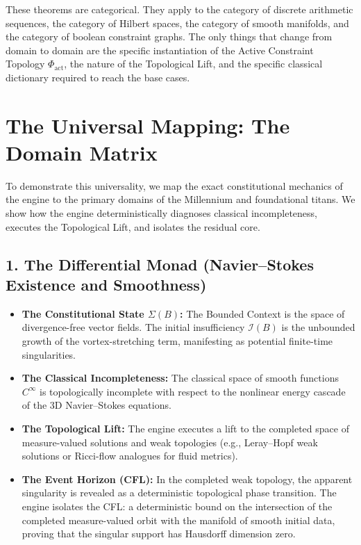 \documentclass[12pt,openany]{extbook}
\theoremstyle{plain}
\theoremstyle{definition}
\begin{document}
These theorems are categorical. They apply to the category of discrete arithmetic sequences, the category of Hilbert spaces, the category of smooth manifolds, and the category of boolean constraint graphs. The only things that change from domain to domain are the specific instantiation of the Active Constraint Topology $\Phi_{\mathrm{act}}$, the nature of the Topological Lift, and the specific classical dictionary required to reach the base cases.

\section{The Universal Mapping: The Domain Matrix}

To demonstrate this universality, we map the exact constitutional mechanics of the engine to the primary domains of the Millennium and foundational titans. We show how the engine deterministically diagnoses classical incompleteness, executes the Topological Lift, and isolates the residual core.

\subsection*{1. The Differential Monad (Navier--Stokes Existence and Smoothness)}
\begin{itemize}
    \item \textbf{The Constitutional State $\Sigma(B)$:} The Bounded Context is the space of divergence-free vector fields. The initial insufficiency $\mathcal{I}(B)$ is the unbounded growth of the vortex-stretching term, manifesting as potential finite-time singularities.
    \item \textbf{The Classical Incompleteness:} The classical space of smooth functions $C^\infty$ is topologically incomplete with respect to the nonlinear energy cascade of the 3D Navier--Stokes equations.
    \item \textbf{The Topological Lift:} The engine executes a lift to the completed space of measure-valued solutions and weak topologies (e.g., Leray--Hopf weak solutions or Ricci-flow analogues for fluid metrics).
    \item \textbf{The Event Horizon (CFL):} In the completed weak topology, the apparent singularity is revealed as a deterministic topological phase transition. The engine isolates the CFL: a deterministic bound on the intersection of the completed measure-valued orbit with the manifold of smooth initial data, proving that the singular support has Hausdorff dimension zero.
\end{itemize}
\end{document}
